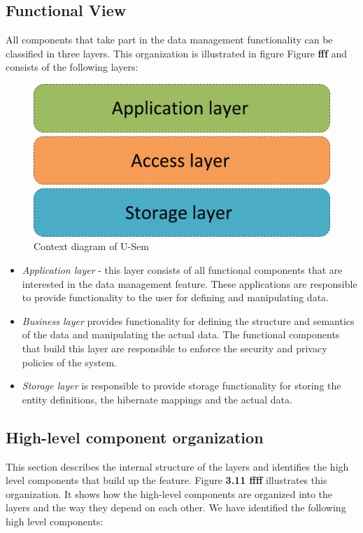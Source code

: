 \documentclass[a4paper, notitlepage]{article}
\begin{document}
\subsection{Functional View}

All components that take part in the data management functionality can be classified in three layers. This organization is illustrated in figure Figure \textbf{fff} and consists of the following layers:

\begin{figure}[h!]
  \centering
  	\includegraphics[scale=0.4]{functional/layers.png}
  \caption{Context diagram of U-Sem }
  \label{fig_context}
\end{figure}

\begin{itemize}
	\item \textit{Application layer} - this layer consists of all functional components that are interested in the data management feature. These applications are responsible to provide functionality to the user for defining and manipulating data.
	
	\item \textit{Business layer} provides functionality for defining the structure and semantics of the data and manipulating the actual data. The functional components that build this layer are responsible to enforce the security and privacy policies of the system.
	
	\item \textit{Storage layer } is responsible to provide storage functionality for storing the entity definitions, the hibernate mappings and the actual data.
\end{itemize}

\subsection{High-level component organization}
This section describes the internal structure of the layers and identifies the high level components that build up the feature. Figure \textbf{3.11 ffff} illustrates this organization. It shows how the high-level components are organized into the layers and the way they depend on each other. We have identified the following high level components:
\end{document}
